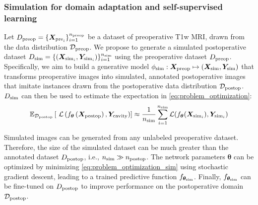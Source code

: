 \subsubsection{Simulation for domain adaptation and self-supervised learning}
\label{sec:sim_res_self}

Let $D_{\textnormal{preop}} = \{ \bm{X}_{\text{pre}_i} \}_{i = 1}^{n_{\textnormal{preop}}}$ be a dataset of preoperative \ac{T1w} \ac{MRI}, drawn from the data distribution $\mathcal{D}_{\textnormal{preop}}$.
We propose to generate a simulated postoperative dataset $D_{\textnormal{sim}} = \{ (\bm{X}_{\text{sim}_i}, \bm{Y}_{\text{sim}_i}) \}_{i = 1}^{n_{\textnormal{sim}}}$ using the preoperative dataset $D_{\textnormal{preop}}$.
Specifically, we aim to build a generative model $\phi_{\textnormal{sim}} : \bm{X}_{\textnormal{preop}} \mapsto (\bm{X}_{\textnormal{sim}}, \bm{Y}_{\textnormal{sim}})$ that transforms preoperative images into simulated, annotated postoperative images that imitate instances drawn from the postoperative data distribution $\mathcal{D}_{\textnormal{postop}}$.
$D_{\textnormal{sim}}$ can then be used to estimate the expectation in \cref{eq:problem_optimization}:
\begin{equation}
    \mathbb{E}_{\mathcal{D}_{\textnormal{postop}}} \left[\
        \mathcal{L}\left(
            f_{\bm{\theta}} \left(\bm{X}_{\textnormal{postop}} \right), \bm{Y}_{\textnormal{cavity}} \right)
        \right]
        \approx \frac{1}{n_{\textnormal{sim}}}\sum_{i=1}^{n_{\textnormal{sim}}} \mathcal{L}(f_{\bm{\theta}}(\bm{X}_{\text{sim}_i}),  \bm{Y}_{\text{sim}_i})
    \label{eq:problem_optimization_sim}
\end{equation}

Simulated images can be generated from any unlabeled preoperative dataset.
Therefore, the size of the simulated dataset can be much greater than the annotated dataset $D_{\textnormal{postop}}$, i.e., $n_{\textnormal{sim}}\gg n_{\textnormal{postop}}$.
The network parameters $\bm{\theta}$ can be optimized by minimizing \cref{eq:problem_optimization_sim} using stochastic gradient descent, leading to a trained predictive function $f_{\bm{\theta_}{\text{sim}}}$.
Finally, $f_{\bm{\theta_}{\text{sim}}}$ can be fine-tuned on $D_{\textnormal{postop}}$ to improve performance on the postoperative domain $\mathcal{D}_{\textnormal{postop}}$.
